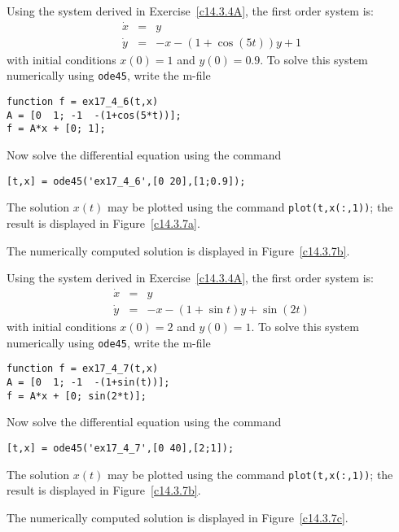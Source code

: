 \soln  Using the system  derived in 
Exercise~\ref{c14.3.4A}, the first order system is:
\begin{eqnarray*}
\dot{x} & = & y \\
\dot{y} & = & -x - (1+\cos(5t))y + 1
\end{eqnarray*}
with initial conditions $x(0)=1$ and $y(0)=0.9$.   To solve this system numerically 
using {\tt ode45}, write the m-file
\begin{verbatim}
function f = ex17_4_6(t,x)
A = [0  1; -1  -(1+cos(5*t))];
f = A*x + [0; 1];
\end{verbatim}
Now solve the differential equation using the command
\begin{verbatim}
[t,x] = ode45('ex17_4_6',[0 20],[1;0.9]);
\end{verbatim}
The solution $x(t)$ may be plotted using the command {\tt plot(t,x(:,1))}; the 
result is displayed in Figure~\ref{c14.3.7a}.
\begin{figure}[htb]
     \centerline{%
     }
\end{figure} 


  \ans The numerically computed solution is displayed in 
Figure~\ref{c14.3.7b}.

\soln  Using the system  derived in 
Exercise~\ref{c14.3.4A}, the first order system is:
\begin{eqnarray*}
\dot{x} & = & y \\
\dot{y} & = & -x - (1+\sin t)y + \sin(2t)
\end{eqnarray*}
with initial conditions $x(0)=2$ and $y(0)=1$.  To solve this system numerically 
using {\tt ode45}, write the m-file
\begin{verbatim}
function f = ex17_4_7(t,x)
A = [0  1; -1  -(1+sin(t))];
f = A*x + [0; sin(2*t)];
\end{verbatim}
Now solve the differential equation using the command
\begin{verbatim}
[t,x] = ode45('ex17_4_7',[0 40],[2;1]);
\end{verbatim}
The solution $x(t)$ may be plotted using the command {\tt plot(t,x(:,1))}; the 
result is displayed in Figure~\ref{c14.3.7b}.
\begin{figure}[htb]
     \centerline{%
     }
\end{figure} 


  \ans The numerically computed solution is displayed in 
Figure~\ref{c14.3.7c}.

